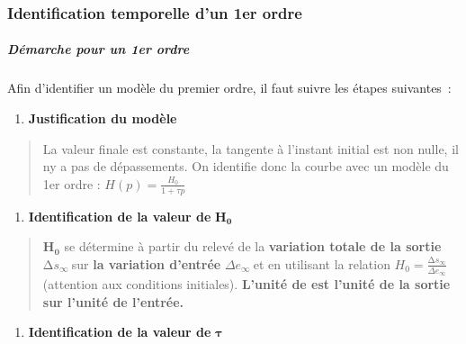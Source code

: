 \hypertarget{mod-identification-temporelle-dun-1er-ordre}{%
\subsubsection[Identification temporelle d'un 1er ordre]{\texorpdfstring{Identification temporelle d'un 1er ordre}{Identification temporelle d'un 1er ordre}}\label{mod-identification-temporelle-dun-1er-ordre}}

\hypertarget{mod-duxe9marche-pour-un-1er-ordre}{%
\subparagraph*{\texorpdfstring{Démarche pour un 1er ordre }{Démarche pour un 1er ordre }}\label{mod-duxe9marche-pour-un-1er-ordre}}

Afin d'identifier un modèle du premier ordre, il faut suivre les étapes suivantes~:

\begin{enumerate}
\def\labelenumi{\arabic{enumi}.}
\item
  \textbf{Justification du modèle}
\end{enumerate}

\begin{quote}
La valeur finale est constante, la tangente à l'instant initial est non nulle, il n\textquotesingle y a pas de dépassements. On identifie donc la courbe avec un modèle du 1er ordre : \(H(p) = \frac{H_{0}}{1 + \tau p}\)
\end{quote}

\begin{enumerate}
\def\labelenumi{\arabic{enumi}.}
\setcounter{enumi}{1}
\item
  \textbf{Identification de la valeur de} \(\mathbf{H}_{\mathbf{0}}\)
\end{enumerate}

\begin{quote}
\(\mathbf{H}_{\mathbf{0}}\) se détermine à partir du relevé de la \textbf{variation totale de la sortie} \({\mathrm{\Delta}s}_{\infty}\ \)sur \textbf{la variation d'entrée} \(\Delta e_{\infty}\ \)et en utilisant la relation \(H_{0} = \frac{{\mathrm{\Delta}s}_{\infty}}{\Delta e_{\infty}}\) (attention aux conditions initiales). \textbf{L'unité de est l'unité de la sortie sur l'unité de l'entrée.}
\end{quote}

\begin{enumerate}
\def\labelenumi{\arabic{enumi}.}
\setcounter{enumi}{2}
\item
  \textbf{Identification de la valeur de} \(\mathbf{\tau}\)
\end{enumerate}


